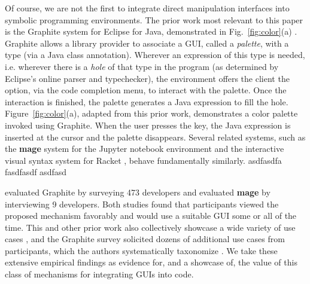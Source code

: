 Of course, we are not the first to integrate direct manipulation interfaces
into symbolic programming environments.
The prior work most relevant to this paper is the {Graphite} system for Eclipse for Java,
demonstrated in Fig.~\ref{fig:color}(a) \cite{Graphite}.
Graphite allows a library provider to associate a GUI, called a \emph{palette}, with a type 
(via a Java class annotation).
Wherever an expression of this type is needed,
i.e. wherever there is a \emph{hole} of that type in the program
(as determined by Eclipse's online parser and typechecker),
the environment offers the client the option, via the code completion menu,
to interact with the palette.
Once the interaction is finished, the palette generates a
Java expression to fill the hole.
Figure~\ref{fig:color}(a), adapted from this prior work, demonstrates a color palette invoked using Graphite.
When the user presses the  key, the Java expression  is inserted at the cursor and the palette disappears.
Several related systems, such as the  
\textbf{mage} system for the Jupyter notebook environment \cite{DBLP:conf/uist/KeryRHMWP20}
and the interactive visual syntax system for Racket \cite{interactive-visual-syntax}, behave fundamentally similarly.
asdfasdfa
fasdfasdf
asdfasd

\citet{Graphite} evaluated Graphite by surveying 473 developers 
and \citet{DBLP:conf/uist/KeryRHMWP20} evaluated \textbf{mage} by interviewing 9 developers.
Both studies found that
participants viewed the proposed mechanism favorably and 
would use a suitable GUI some or all of the time.
This and other prior work also collectively showcase a wide variety of use cases \cite{Graphite,DBLP:conf/uist/KeryRHMWP20,interactive-visual-syntax}, 
and the Graphite survey solicited dozens of additional use cases from participants,
which the authors systematically taxonomize \cite{Graphite}. 
We take these extensive empirical findings   
as evidence for, and a showcase of, 
the value of this class of mechanisms for integrating GUIs into code.

